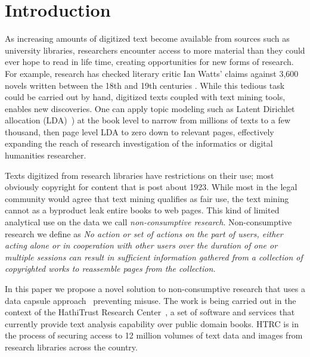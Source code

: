 \documentclass{acm_proc_article-sp}
\begin{document}


\section{Introduction}
As increasing amounts of digitized text become available from sources such as university libraries, researchers encounter access to more material than they could ever hope to read in life time, creating opportunities for new forms of research. For example, research has checked literary critic Ian Watts' claims against 3,600 novels written between the 18th and 19th centuries \cite{Example}. While this tedious task could be carried out by hand, digitized texts coupled with text mining tools, enables new discoveries.  One can apply topic modeling such as Latent Dirichlet allocation (LDA)~\cite{LDA}) at the book level to narrow from millions of texts to a few thousand, then page level LDA to zero down to relevant pages, effectively expanding the reach of research investigation of the informatics or digital humanities researcher.

Texts digitized from research libraries have restrictions on their use; most obviously copyright for content that is post about 1923.  While most in the legal community would agree that text mining qualifies as fair use, the text mining cannot as a byproduct leak entire books to web pages.  This kind of limited analytical use on the data we call \textit{non-consumptive research}.  Non-consumptive research we define as \textit{No action or set of actions on the part of users, either
acting alone or in cooperation with other users over the duration of one or multiple sessions can result in sufficient information gathered from a collection of copyrighted works to reassemble pages from the collection.}

In this paper we propose a novel solution to non-consumptive research that uses a data capsule approach~\cite{Borders:2009:PCD:1855768.1855791} preventing misuse.  The work is being carried out in the context of the HathiTrust Research Center~\cite{HTRC}, a set of software and services that currently provide text analysis capability over public domain books.  HTRC is in the process of securing access to 12 million volumes of text data and images from research libraries across the country.
\end{document}
